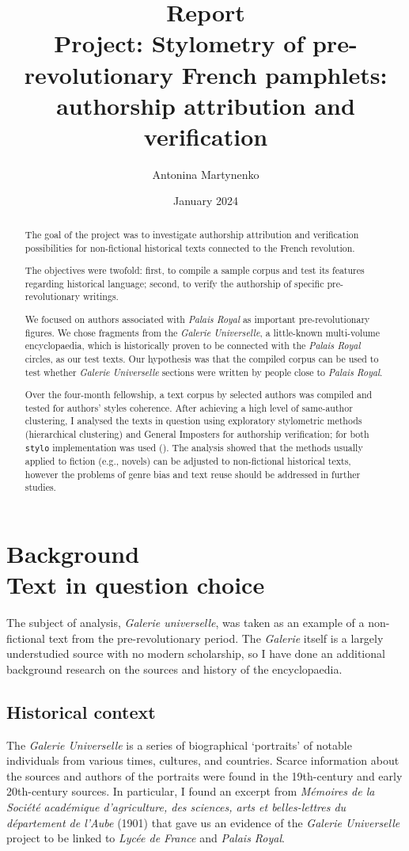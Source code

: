 \documentclass[12pt, letterpaper]{article}
\title{Report\\ \small Project: Stylometry of pre-revolutionary French pamphlets: authorship attribution and verification}
\author{Antonina Martynenko}
\date{January 2024}
\begin{document}
    
\maketitle

\begin{abstract}
    The goal of the project was to investigate authorship attribution and verification possibilities for non-fictional historical texts connected to the French revolution.

    The objectives were twofold: first, to compile a sample corpus and test its features regarding historical language; second, to verify the authorship of specific pre-revolutionary writings.
    
    We focused on authors associated with \emph{Palais Royal} as important pre-revolutionary figures. We chose fragments from the \emph{Galerie Universelle}, a little-known multi-volume encyclopaedia, which is historically proven to be connected with the \emph{Palais Royal} circles, as our test texts. Our hypothesis was that the compiled corpus can be used to test whether \emph{Galerie Universelle} sections were written by people close to \emph{Palais Royal}.

    Over the four-month fellowship, a text corpus by selected authors was compiled and tested for authors' styles coherence. After achieving a high level of same-author clustering, I analysed the texts in question using exploratory stylometric methods (hierarchical clustering) and General Imposters for authorship verification; for both \verb|stylo| implementation was used (\cite{eder_stylometry_2016}). The analysis showed that the methods usually applied to fiction (e.g., novels) can be adjusted to non-fictional historical texts, however the problems of genre bias and text reuse should be addressed in further studies.
\end{abstract}

\section{Background\\ \small Text in question choice}
The subject of analysis, \emph{Galerie universelle}, was taken as an example of a non-fictional text from the pre-revolutionary period. The \emph{Galerie} itself is a largely understudied source with no modern scholarship, so I have done an additional background research on the sources and history of the encyclopaedia.

\subsection{Historical context}
The \emph{Galerie Universelle} is a series of biographical `portraits' of notable individuals from various times, cultures, and countries. Scarce information about the sources and authors of the portraits were found in the 19th-century and early 20th-century sources. In particular, I found an excerpt from \emph{Mémoires de la Société académique d'agriculture, des sciences, arts et belles-lettres du département de l'Aube} (1901) that gave us an evidence of the \emph{Galerie Universelle} project to be linked to \emph{Lycée de France} and \emph{Palais Royal}.
\end{document}
